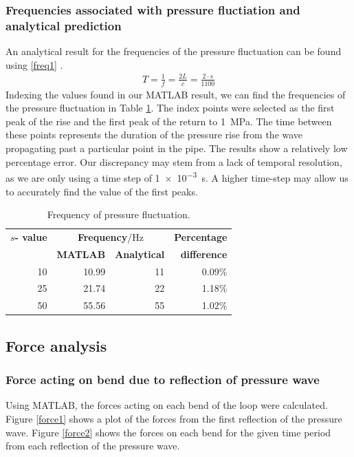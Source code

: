 \subsubsection{Frequencies associated with pressure fluctiation and analytical prediction}
An analytical result for the frequencies of the pressure fluctuation can be found using \eqref{freq1} \cite{piping}.
\begin{gather}\label{freq1}
    T = \frac{1}{f} = \frac{2L}{c} = \frac{2\cdot s}{1100}
\end{gather}
Indexing the values found in our MATLAB result, we can find the frequencies of the pressure fluctuation in Table \ref{freq2}. The index points were selected as the first peak of the rise and the first peak of the return to \SI{1}{\mega\pascal}. The time between these points represents the duration of the pressure rise from the wave propagating past a particular point in the pipe. The results show a relatively low percentage error. Our discrepancy may stem from a lack of temporal resolution, as we are only using a time step of \SI{1e-3}{\second}. A higher time-step may allow us to accurately find the value of the first peaks.
\begin{table}[H]
    \centering
    \begin{tabular}{@{}rrrr@{}}
        \toprule
        \textbf{$s$- value} & \multicolumn{2}{c}{\textbf{Frequency}/\si{\hertz}} & \textbf{Percentage}                       \\
                            & \textbf{MATLAB}                                    & \textbf{Analytical} & \textbf{difference} \\
        \midrule
        10                  & 10.99                                              & 11                  & 0.09\%              \\
        25                  & 21.74                                              & 22                  & 1.18\%              \\
        50                  & 55.56                                              & 55                  & 1.02\%              \\
        \bottomrule
    \end{tabular}
    \caption{Frequency of pressure fluctuation.}
    \label{freq2}
\end{table}
\subsection{Force analysis}
\subsubsection{Force acting on bend due to reflection of pressure wave}
Using MATLAB, the forces acting on each bend of the loop were calculated. Figure \ref{force1} shows a plot of the forces from the first reflection of the pressure wave. Figure \ref{force2} shows the forces on each bend for the given time period from each reflection of the pressure wave.

